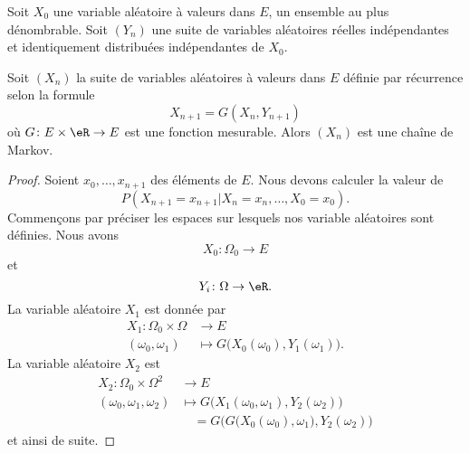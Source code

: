 \begin{proposition}     \label{PropqiMdHh}
    Soit \( X_0\) une variable aléatoire à valeurs dans $E$, un ensemble au plus dénombrable. Soit \( (Y_n)\) une suite de variables aléatoires réelles indépendantes et identiquement distribuées indépendantes de \( X_0\).

    Soit \( (X_n)\) la suite de variables aléatoires à valeurs dans \( E\) définie par récurrence selon la formule
    \begin{equation}
        X_{n+1}=G(X_n,Y_{n+1})
    \end{equation}
    où \( G\colon E\times \eR\to E\) est une fonction mesurable. Alors \( (X_n)\) est une chaîne de Markov.
\end{proposition}

\begin{proof}
    Soient \( x_0,\ldots, x_{n+1}\) des éléments de \( E\). Nous devons calculer la valeur de
    \begin{equation}
        P(X_{n+1}=x_{n+1}|X_n=x_n,\ldots, X_0=x_0).
    \end{equation}
    Commençons par préciser les espaces sur lesquels nos variable aléatoires sont définies. Nous avons
    \begin{equation}
        X_0\colon \Omega_0\to E
    \end{equation}
    et 
    \begin{equation}
        Y_i\colon \Omega\to \eR.
    \end{equation}
    La variable aléatoire \( X_1\) est donnée par
    \begin{equation}
        \begin{aligned}
            X_1\colon \Omega_0\times \Omega&\to E \\
            (\omega_0,\omega_1)&\mapsto G\big( X_0(\omega_0),Y_1(\omega_1) \big). 
        \end{aligned}
    \end{equation}
    La variable aléatoire \( X_2\) est 
    \begin{equation}
        \begin{aligned}
            X_2\colon \Omega_0\times \Omega^2&\to E \\
            (\omega_0,\omega_1,\omega_2)&\mapsto G\big( X_1(\omega_0,\omega_1),Y_2(\omega_2) \big)\\
                &\quad=G\Big( G\big( X_0(\omega_0),\omega_1 \big),Y_2(\omega_2) \Big)
        \end{aligned}
    \end{equation}
    et ainsi de suite.


\end{proof}
